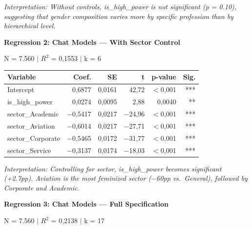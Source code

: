 \documentclass[12pt,a4paper]{article}
\begin{document}
\noindent\textit{Interpretation: Without controls, is\_high\_power is not significant (p =
0.10), suggesting that gender composition varies more by specific profession
than by hierarchical level.}

\vspace{0.5cm}
\noindent\textbf{Regression 2: Chat Models --- With Sector Control}

\noindent N = 7.560 $|$ $R^2$ = 0,1553 $|$ k = 6

\begin{table}[H]
\centering
\begin{tabular}{lrrrrr}
\toprule
\textbf{Variable} & \textbf{Coef.} & \textbf{SE} & \textbf{t} & \textbf{p-value} & \textbf{Sig.} \\
\midrule
Intercept & 0,6877 & 0,0161 & 42,72 & $<$0,001 & *** \\
is\_high\_power & 0,0274 & 0,0095 & 2,88 & 0,0040 & ** \\
sector\_Academic & $-$0,5417 & 0,0217 & $-$24,96 & $<$0,001 & *** \\
sector\_Aviation & $-$0,6014 & 0,0217 & $-$27,71 & $<$0,001 & *** \\
sector\_Corporate & $-$0,5465 & 0,0172 & $-$31,77 & $<$0,001 & *** \\
sector\_Service & $-$0,3137 & 0,0174 & $-$18,03 & $<$0,001 & *** \\
\bottomrule
\end{tabular}
\end{table}

\noindent\textit{Interpretation: Controlling for sector, is\_high\_power becomes
significant (+2.7pp). Aviation is the most feminized sector ($-$60pp vs.\
General), followed by Corporate and Academic.}

\vspace{0.5cm}
\noindent\textbf{Regression 3: Chat Models --- Full Specification}

\noindent N = 7.560 $|$ $R^2$ = 0,2138 $|$ k = 17
\end{document}
